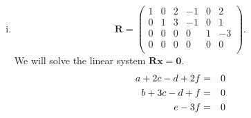 \documentclass{article}
\newcommand{\bs}[1]{\boldsymbol{#1}}
\begin{document}
\begin{enumerate}[(i)]
\begin{eqnarray}
{\begin{array}{c}
    -5 \\
    7 \\
    -1 \\
    \end{array}\right)\right\|^2}\left(\begin{array}{c}
    -1 \\
    -5 \\
    7 \\
    -1 \\
    \end{array}\right)  = \frac{1}{19}\left(\begin{array}{c}
    2 \\
    10 \\
    5 \\
    -17 \\
    \end{array}\right)\notag
\end{eqnarray}
Thus, an orthogonal basis for the column space of $\bs{A}$ would be $\left\{\left(\begin{array}{c}
    1 \\
    1 \\
    1 \\
    1 \\
    \end{array}\right),\left(\begin{array}{c}
    -1 \\
    -5 \\
    7 \\
    -1 \\
    \end{array}\right),\left(\begin{array}{c}
    2 \\
    10 \\
    5 \\
    -17 \\
    \end{array}\right)\right\}$.
\item 
$$\bs{R} = \left(\begin{array}{cccccc}
     1 & 0 & 2 & -1 & 0 & 2\\
     0 & 1 & 3 & -1 & 0 & 1\\
    0 & 0 & 0 & 0 & 1 & -3 \\
    0 & 0 & 0 & 0 & 0 & 0 \\
    \end{array}\right).$$
We will solve the linear system $\bs{Rx} = \bs{0}$.
\begin{eqnarray}
    a +2c -d +2f &=& 0 \notag\\
    b+3c-d+f &=& 0 \notag \\
    e-3f &=& 0 \notag
\end{eqnarray}


\end{enumerate}
\end{document}
